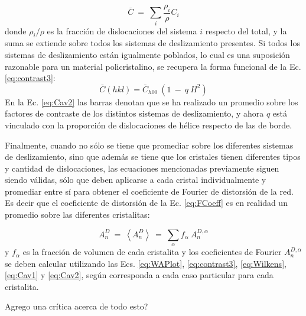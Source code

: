 \begin{equation}
  \bar{C} \ = \ \sum_i \frac{\rho_i}{\rho} C_i
  \label{eq:Cav1}
\end{equation}
\noindent
donde $\rho_i/\rho$ es la fracción de dislocaciones del sistema $i$ respecto del total, y la suma se extiende sobre todos los sistemas de deslizamiento presentes.
Si todos los sistemas de deslizamiento están igualmente poblados, lo cual es una suposición razonable para un material policristalino, se recupera la forma funcional de la Ec. \ref{eq:contrast3}:
\begin{equation}
  \bar{C}(hkl) = \bar{C}_{h00}\ (1 \ - \ q\ H^2)
  \label{eq:Cav2}
\end{equation}
\noindent
En la Ec. \ref{eq:Cav2} las barras denotan que se ha realizado un promedio sobre los factores de contraste de los distintos sistemas de deslizamiento, y ahora $q$ está vinculado con la proporción de dislocaciones de hélice respecto de las de borde.

Finalmente, cuando no sólo se tiene que promediar sobre los diferentes sistemas de deslizamiento, sino que además se tiene que los cristales tienen diferentes tipos y cantidad de dislocaciones, las ecuaciones mencionadas previamente siguen siendo válidas, sólo que deben aplicarse a cada cristal individualmente y promediar entre sí para obtener el coeficiente de Fourier de distorsión de la red. Es decir que el coeficiente de distorsión de la Ec. \ref{eq:FCoeff} es en realidad un promedio sobre las diferentes cristalitas:

\begin{equation}
  A_n^D \ = \ \left< A_n^D \right> \ = \ \sum_{\alpha} f_{\alpha} \ A_{n}^{D,\alpha}
  \label{eq:FCoeffAv}
\end{equation}
\noindent
y $f_{\alpha}$ es la fracción de volumen de cada cristalita y los coeficientes de Fourier $A_{n}^{D,\alpha}$ se deben calcular utilizando las Ecs. \ref{eq:WAPlot}, \ref{eq:contrast3}, \ref{eq:Wilkens}, \ref{eq:Cav1} y \ref{eq:Cav2}, según corresponda a cada caso particular para cada cristalita.

Agrego una crítica acerca de todo esto?


